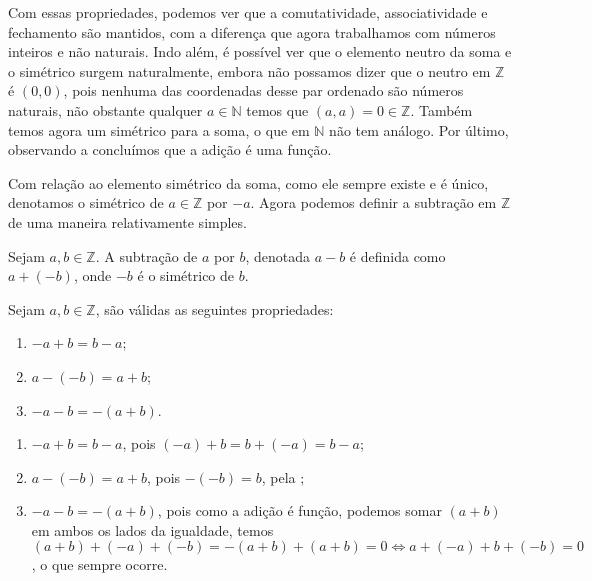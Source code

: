 \documentclass[../main.tex]{subfiles}
\begin{document}
Com essas propriedades, podemos ver que a comutatividade, associatividade e fechamento são mantidos, com a diferença que agora trabalhamos com números inteiros e não naturais. Indo além, é possível ver que o elemento neutro da soma e o simétrico surgem naturalmente, embora não possamos dizer que o neutro em $\mathbb{Z}$ é $(0,0)$, pois nenhuma das coordenadas desse par ordenado são números naturais, não obstante qualquer $a \in \mathbb{N}$ temos que $(a,a) = 0 \in \mathbb{Z}$. Também temos agora um simétrico para a soma, o que em $\mathbb{N}$ não tem análogo. Por último, observando a  concluímos que a adição é uma função.

Com relação ao elemento simétrico da soma, como ele sempre existe e é único, denotamos o simétrico de $a \in \mathbb{Z}$ por $-a$. Agora podemos definir a subtração em $\mathbb{Z}$ de uma maneira relativamente simples.

\begin{defi}\label{int-def-subtracao}
    Sejam $a,b \in \mathbb{Z}$. A subtração de $a$ por $b$, denotada $a - b$ é definida como $a + (-b)$, onde $-b$ é o simétrico de $b$.
\end{defi}
\begin{prop} Sejam $a,b \in \mathbb{Z}$, são válidas as seguintes propriedades:
    \begin{enumerate}[label=(\roman*)]
        \item $-a + b = b - a$;
        \item $a - ( - b) = a+b$;
        \item $-a-b = -(a+b)$.
    \end{enumerate}
\end{prop}
\begin{dem}
        \begin{enumerate}[label=(\roman*)]
        \item $-a + b = b - a$, pois $(-a) + b = b + (-a) = b-a$;
        \item $a - ( - b) = a+b$, pois $-(-b) = b$, pela ;
        \item $-a-b = -(a+b)$, pois como a adição é função, podemos somar $(a+b)$ em ambos os lados da igualdade, temos
        $(a+b)+(-a)+(-b) = -(a+b) + (a+b) = 0 \iff a+(-a) + b+(-b) = 0$, o que sempre ocorre.
    \end{enumerate}
\end{dem}
\end{document}
